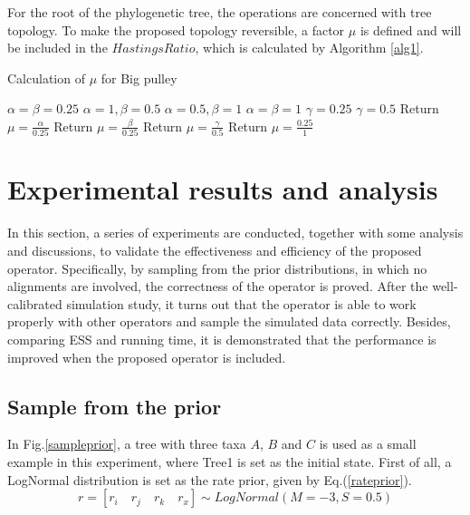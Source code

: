 \documentclass{bmcart}
\begin{document}
For the root of the phylogenetic tree, the operations are concerned with tree topology. To make the proposed topology reversible, a factor $\mu$ is defined and will be included in the $HastingsRatio$, which is calculated by Algorithm \ref{alg1}.
\begin{algorithm}
\caption{Calculation of $\mu$ for Big pulley}
\label{alg1}
\begin{algorithmic}[1]
\STATE $\alpha  = \beta  = 0.25$
\STATE $\alpha  = 1,\beta  = 0.5$
\STATE $\alpha  = 0.5,\beta  = 1$
\STATE $\alpha  = \beta  = 1$
\ENDIF
{}
\STATE $\gamma  = 0.25$
\ELSE
\STATE $\gamma  = 0.5$
\ENDIF
{}
\STATE Return $\mu = \frac{\alpha }{{0.25}}$
\ENDFOR
{}
\STATE Return $\mu = \frac{\beta }{{0.25}}$
\ENDFOR
{}
\STATE Return $\mu = \frac{\gamma }{{0.5}}$
\ENDFOR
{}
\STATE Return $\mu = \frac{{0.25}}{1}$
\ENDFOR
\end{algorithmic}
\end{algorithm}
\section*{Experimental results and analysis}
In this section, a series of experiments are conducted, together with some analysis and discussions, to validate the effectiveness and efficiency of the proposed operator. Specifically, by sampling from the prior distributions, in which no alignments are involved, the correctness of the operator is proved. After the well-calibrated simulation study, it turns out that the operator is able to work properly with other operators and sample the simulated data correctly. Besides, comparing ESS and running time, it is demonstrated that the performance is improved when the proposed operator is included.

\subsection*{Sample from the prior}
In Fig.\ref{sampleprior}, a tree with three taxa $A$, $B$ and $C$  is used as a small example in this experiment, where Tree1 is set as the initial state. First of all, a LogNormal distribution is set as the rate prior, given by Eq.(\ref{rateprior}).
\begin{equation}\label{rateprior}
r = [{r_i}\quad{r_j}\quad{r_k}\quad{r_x}] \sim LogNormal(M = -3, S = 0.5)
\end{equation}
\end{document}
